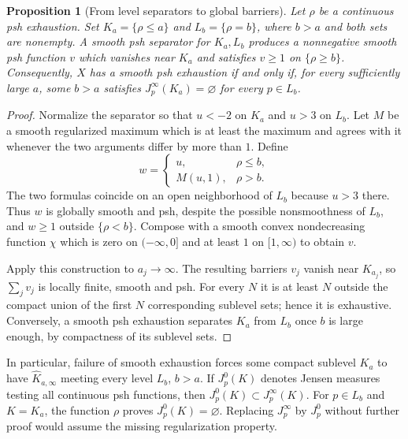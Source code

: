 \documentclass[11pt]{article}
\newtheorem{proposition}[theorem]{Proposition}
\theoremstyle{remark}
\begin{document}
\begin{proposition}[From level separators to global barriers]
\label{prop:separator-barriers}
Let $\rho$ be a continuous psh exhaustion. Set $K_a=\{\rho\le a\}$ and
$L_b=\{\rho=b\}$, where $b>a$ and both sets are nonempty. A smooth psh
separator for $K_a,L_b$ produces a nonnegative smooth psh function $v$
which vanishes near $K_a$ and satisfies $v\ge1$ on $\{\rho\ge b\}$.
Consequently, $X$ has a smooth psh exhaustion if and only if, for every
sufficiently large $a$, some $b>a$ satisfies
$J_p^\infty(K_a)=\varnothing$ for every $p\in L_b$.
\end{proposition}
\begin{proof}
Normalize the separator so that $u<-2$ on $K_a$ and $u>3$ on $L_b$.
Let $M$ be a smooth regularized maximum which is at least the maximum
and agrees with it whenever the two arguments differ by more than $1$.
Define
\[
 w=\begin{cases}
      u,&\rho\le b,\\
      M(u,1),&\rho>b.
    \end{cases}
\]
The two formulas coincide on an open neighborhood of $L_b$ because
$u>3$ there. Thus $w$ is globally smooth and psh, despite the possible
nonsmoothness of $L_b$, and $w\ge1$ outside $\{\rho<b\}$.
Compose with a smooth convex nondecreasing function $\chi$ which is zero
on $(-\infty,0]$ and at least $1$ on $[1,\infty)$ to obtain $v$.

Apply this construction to $a_j\to\infty$. The resulting barriers $v_j$
vanish near $K_{a_j}$, so $\sum_jv_j$ is locally finite, smooth and psh.
For every $N$ it is at least $N$ outside the compact union of the first
$N$ corresponding sublevel sets; hence it is exhaustive. Conversely,
a smooth psh exhaustion separates $K_a$ from $L_b$ once $b$ is large
enough, by compactness of its sublevel sets.
\end{proof}

In particular, failure of smooth exhaustion forces some compact sublevel
$K_a$ to have $\widehat K_{a,\infty}$ meeting every level $L_b$, $b>a$.
If $J_p^0(K)$ denotes Jensen measures testing all continuous psh functions,
then $J_p^0(K)\subset J_p^\infty(K)$. For $p\in L_b$ and $K=K_a$,
the function $\rho$ proves $J_p^0(K)=\varnothing$. Replacing
$J_p^\infty$ by $J_p^0$ without further proof would assume the missing
regularization property.
\end{document}
